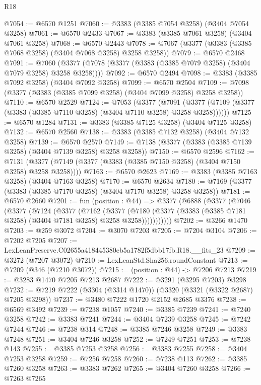 \begin{lexlean}{R18}
\begin{coremodule}
@7054 := @6570 @1251
@7060 := @3383 (@3385 @7054 @3258) (@3404 @7054 @3258)
@7061 := @6570 @2433
@7067 := @3383 (@3385 @7061 @3258) (@3404 @7061 @3258)
@7068 := @6570 @2443
@7078 := @7067 (@3377 (@3383 (@3385 @7068 @3258) (@3404 @7068 @3258) @3258 @3258))
@7079 := @6570 @2468
@7091 := @7060 (@3377 (@7078 (@3377 (@3383 (@3385 @7079 @3258) (@3404 @7079 @3258) @3258 @3258))))
@7092 := @6570 @2494
@7098 := @3383 (@3385 @7092 @3258) (@3404 @7092 @3258)
@7099 := @6570 @2504
@7109 := @7098 (@3377 (@3383 (@3385 @7099 @3258) (@3404 @7099 @3258) @3258 @3258))
@7110 := @6570 @2529
@7124 := @7053
    (@3377
      (@7091 (@3377 (@7109 (@3377 (@3383 (@3385 @7110 @3258) (@3404 @7110 @3258) @3258 @3258))))))
@7125 := @6570 @1284
@7131 := @3383 (@3385 @7125 @3258) (@3404 @7125 @3258)
@7132 := @6570 @2560
@7138 := @3383 (@3385 @7132 @3258) (@3404 @7132 @3258)
@7139 := @6570 @2570
@7149 := @7138 (@3377 (@3383 (@3385 @7139 @3258) (@3404 @7139 @3258) @3258 @3258))
@7150 := @6570 @2596
@7162 := @7131 (@3377 (@7149 (@3377 (@3383 (@3385 @7150 @3258) (@3404 @7150 @3258) @3258 @3258))))
@7163 := @6570 @2623
@7169 := @3383 (@3385 @7163 @3258) (@3404 @7163 @3258)
@7170 := @6570 @2634
@7180 := @7169 (@3377 (@3383 (@3385 @7170 @3258) (@3404 @7170 @3258) @3258 @3258))
@7181 := @6570 @2660
@7201 := fun (position : @44) =>
  @3377
    (@6888
      (@3377
        (@7046
          (@3377
            (@7124
              (@3377
                (@7162
                  (@3377
                    (@7180
                      (@3377 (@3383 (@3385 @7181 @3258) (@3404 @7181 @3258) @3258 @3258)))))))))))
@7202 := @3266 @1470
@7203 := @259 @3072
@7204 := @3070 @7203
@7205 := @7204 @3104
@7206 := @7202 @7205
@7207 := LexLeanPreserve.C02655a418445380eb5a1782f5dbb17fb.R18.__fits_23
@7209 := @3272 (@7207 @3072)
@7210 := LexLeanStd.Sha256.roundConstant
@7213 := @7209 (@346 (@7210 @3072))
@7215 := (position : @44) -> @7206 @7213
@7219 := @3283 @1470 @7205 @7213 @2687
@7222 := @3291 (@3295 @7203) @3298
@7232 := @7219 @7222 (@3304 (@3314 @1470)) (@3320 (@3321 (@3322 @2687) @7205 @3298))
@7237 := @3480 @7222 @1720 @2152 @2685 @3376
@7238 := @6569 @3492
@7239 := @7238 @1057
@7240 := @3385 @7239
@7241 := @7240 @3258
@7242 := @3383 @7241
@7244 := @3404 @7239 @3258
@7245 := @7242 @7244
@7246 := @7238 @314
@7248 := @3385 @7246 @3258
@7249 := @3383 @7248
@7251 := @3404 @7246 @3258
@7252 := @7249 @7251
@7253 := @7238 @143
@7255 := @3385 @7253 @3258
@7256 := @3383 @7255
@7258 := @3404 @7253 @3258
@7259 := @7256 @7258
@7260 := @7238 @113
@7262 := @3385 @7260 @3258
@7263 := @3383 @7262
@7265 := @3404 @7260 @3258
@7266 := @7263 @7265

\end{coremodule}
\end{lexlean}

